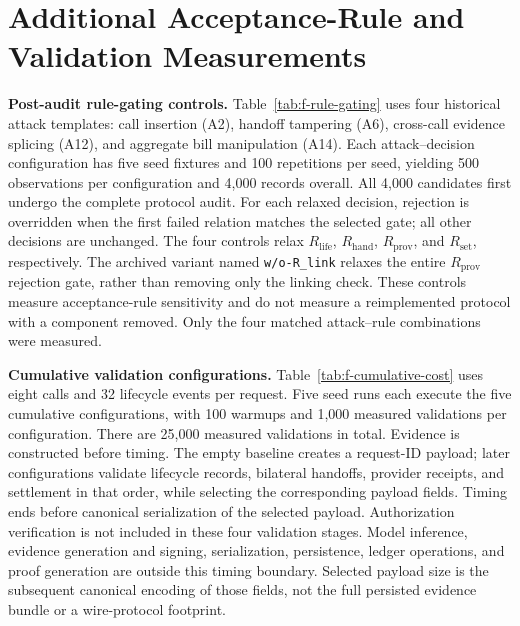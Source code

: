 \section{Additional Acceptance-Rule and Validation Measurements}
\label{app:f-ablation}

\noindent\textbf{Post-audit rule-gating controls.}
Table~\ref{tab:f-rule-gating} uses four historical attack templates: call
insertion (A2), handoff tampering (A6), cross-call evidence splicing (A12),
and aggregate bill manipulation (A14).
Each attack--decision configuration has five seed fixtures and 100 repetitions
per seed, yielding 500 observations per configuration and 4,000 records overall.
All 4,000 candidates first undergo the complete protocol audit.
For each relaxed decision, rejection is overridden when the first failed
relation matches the selected gate; all other decisions are unchanged.
The four controls relax $R_{\mathrm{life}}$, $R_{\mathrm{hand}}$,
$R_{\mathrm{prov}}$, and $R_{\mathrm{set}}$, respectively.
The archived variant named \texttt{w/o-R\_link} relaxes the entire
$R_{\mathrm{prov}}$ rejection gate, rather than removing only the linking check.
These controls measure acceptance-rule sensitivity and do not measure a
reimplemented protocol with a component removed.
Only the four matched attack--rule combinations were measured.

\noindent\textbf{Cumulative validation configurations.}
Table~\ref{tab:f-cumulative-cost} uses eight calls and 32 lifecycle events per
request. Five seed runs each execute the five cumulative configurations, with
100 warmups and 1,000 measured validations per configuration.
There are 25,000 measured validations in total.
Evidence is constructed before timing.
The empty baseline creates a request-ID payload; later configurations validate
lifecycle records, bilateral handoffs, provider receipts, and settlement in
that order, while selecting the corresponding payload fields.
Timing ends before canonical serialization of the selected payload.
Authorization verification is not included in these four validation stages.
Model inference, evidence generation and signing, serialization, persistence,
ledger operations, and proof generation are outside this timing boundary.
Selected payload size is the subsequent canonical encoding of those fields,
not the full persisted evidence bundle or a wire-protocol footprint.

